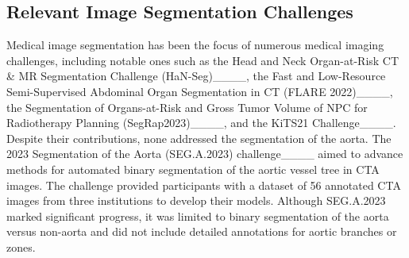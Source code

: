 \subsection{Relevant Image Segmentation Challenges}
\label{sect:aorta-related-challenges}
Medical image segmentation has been the focus of numerous medical imaging challenges, including notable ones such as the Head and Neck Organ-at-Risk CT \& MR Segmentation Challenge (HaN-Seg)____, the Fast and Low-Resource Semi-Supervised Abdominal Organ Segmentation in CT (FLARE 2022)____, the Segmentation of Organs-at-Risk and Gross Tumor Volume of NPC for Radiotherapy Planning (SegRap2023)____, and the KiTS21 Challenge____. Despite their contributions, none addressed the segmentation of the aorta. The 2023 Segmentation of the Aorta (SEG.A.2023) challenge____ aimed to advance methods for automated binary segmentation of the aortic vessel tree in CTA images. The challenge provided participants with a dataset of 56 annotated CTA images from three institutions to develop their models. Although SEG.A.2023 marked significant progress, it was limited to binary segmentation of the aorta versus non-aorta and did not include detailed annotations for aortic branches or zones.